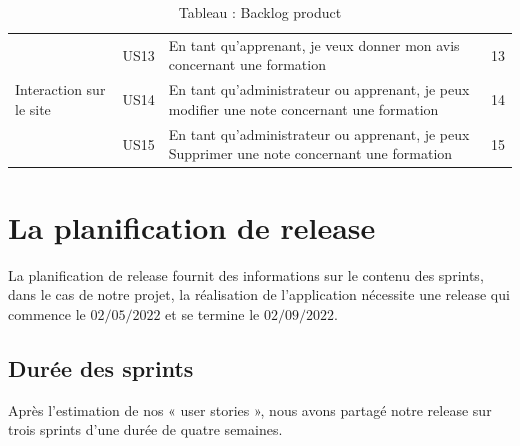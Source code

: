 \begin{table}[!h]
\begin{tabular}{|p{4cm}|p{1cm}|p{8.5cm}|c|}
		
			
		\hline
	& US13&En tant qu'apprenant, je veux donner mon avis concernant une formation & 13\\
	\cline{2-4}
	\multirow{-2}{4cm}{Interaction sur le site}& US14&En tant qu'administrateur ou apprenant, je peux modifier une note concernant une formation  & 14\\
	\cline{2-4}
	& US15&En tant qu'administrateur ou apprenant, je peux Supprimer une note concernant une formation  & 15\\
	\hline	
		
	\end{tabular}
	\caption{Tableau : Backlog product}
\end{table}

\section{La planification de release}
La planification de release fournit des informations sur le contenu des sprints, dans le cas de notre
projet, la réalisation de l’application nécessite une release qui commence le $02/05/2022$ et se termine le $02/09/2022$.
\subsection{Durée des sprints}
Après l’estimation de nos « user stories », nous avons partagé notre release sur trois sprints d’une
durée de quatre semaines.
